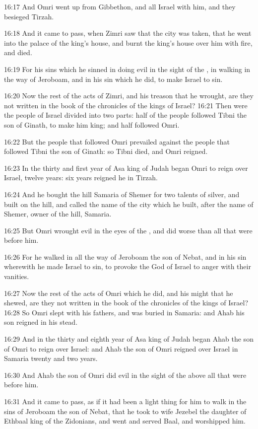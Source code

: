16:17 And Omri went up from Gibbethon, and all Israel with him, and
they besieged Tirzah.

16:18 And it came to pass, when Zimri saw that the city was taken,
that he went into the palace of the king's house, and burnt the king's
house over him with fire, and died.

16:19 For his sins which he sinned in doing evil in the sight of the
\LORD, in walking in the way of Jeroboam, and in his sin which he did,
to make Israel to sin.

16:20 Now the rest of the acts of Zimri, and his treason that he
wrought, are they not written in the book of the chronicles of the
kings of Israel?  16:21 Then were the people of Israel divided into
two parts: half of the people followed Tibni the son of Ginath, to
make him king; and half followed Omri.

16:22 But the people that followed Omri prevailed against the people
that followed Tibni the son of Ginath: so Tibni died, and Omri
reigned.

16:23 In the thirty and first year of Asa king of Judah began Omri to
reign over Israel, twelve years: six years reigned he in Tirzah.

16:24 And he bought the hill Samaria of Shemer for two talents of
silver, and built on the hill, and called the name of the city which
he built, after the name of Shemer, owner of the hill, Samaria.

16:25 But Omri wrought evil in the eyes of the \LORD, and did worse
than all that were before him.

16:26 For he walked in all the way of Jeroboam the son of Nebat, and
in his sin wherewith he made Israel to sin, to provoke the \LORD God of
Israel to anger with their vanities.

16:27 Now the rest of the acts of Omri which he did, and his might
that he shewed, are they not written in the book of the chronicles of
the kings of Israel?  16:28 So Omri slept with his fathers, and was
buried in Samaria: and Ahab his son reigned in his stead.

16:29 And in the thirty and eighth year of Asa king of Judah began
Ahab the son of Omri to reign over Israel: and Ahab the son of Omri
reigned over Israel in Samaria twenty and two years.

16:30 And Ahab the son of Omri did evil in the sight of the \LORD above
all that were before him.

16:31 And it came to pass, as if it had been a light thing for him to
walk in the sins of Jeroboam the son of Nebat, that he took to wife
Jezebel the daughter of Ethbaal king of the Zidonians, and went and
served Baal, and worshipped him.

